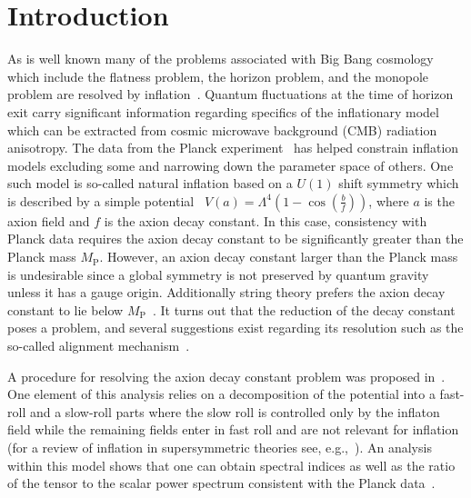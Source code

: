 \documentclass[12pt]{article}
\begin{document}
\section{Introduction \label{sec:Introduction}}
As is well known many of the problems associated with Big Bang cosmology which include
the flatness problem, the horizon problem, and the monopole problem are resolved by inflation~\cite{Guth:1980zm, Starobinsky:1980te, Linde:1981mu, Albrecht:1982wi, Sato:1980yn, Linde:1983gd}.
Quantum fluctuations at the time of horizon exit carry significant information regarding specifics of the inflationary model~\cite{Mukhanov:1981xt, Hawking:1982cz, Starobinsky:1982ee, Guth:1982ec, Bardeen:1983qw, Cheung:2007st} which can be extracted from cosmic microwave background (CMB) radiation anisotropy.
The data from the Planck experiment~\cite{Adam:2015rua, Ade:2015lrj, Array:2015xqh} has helped constrain inflation models excluding some and narrowing down the parameter space of others.
One such model is so-called natural inflation based on a $U(1)$ shift symmetry which is described by a simple potential~\cite{Freese:1990rb, Adams:1992bn} $V\left(a\right) = \Lambda^4 \left(1 - \cos\left(\frac{b}{f}\right)\right)$, where $a$ is the axion field and $f$ is the axion decay constant.
In this case, consistency with Planck data requires the axion decay constant to be significantly greater than the Planck mass $M_\text{P}$.
However, an axion decay constant larger than the Planck mass is undesirable since a global symmetry is not preserved by quantum gravity unless it has a gauge origin.
Additionally string theory prefers the axion decay constant to lie below $M_\text{P}$~\cite{Banks:2003sx, Svrcek:2006yi}.
It turns out that the reduction of the decay constant poses a problem, and several suggestions exist regarding its resolution such as the so-called alignment mechanism~\cite{Kim:2004rp, Long:2014dta}.

A procedure for resolving the axion decay constant problem was proposed in~\cite{Nath:2017ihp}.
One element of this analysis relies on a decomposition of the potential into a fast-roll and a slow-roll parts where the slow roll is controlled only by the inflaton field while the remaining fields enter in fast roll and are not relevant for inflation~\cite{Nath:2017ihp} (for a review of inflation in supersymmetric theories see, e.g.,~\cite{Nath:2016qzm}).
An analysis within this model shows that one can obtain spectral indices as well as the ratio of the tensor to the scalar power spectrum consistent with the Planck data~\cite{Adam:2015rua, Ade:2015lrj, Array:2015xqh}.
\end{document}
